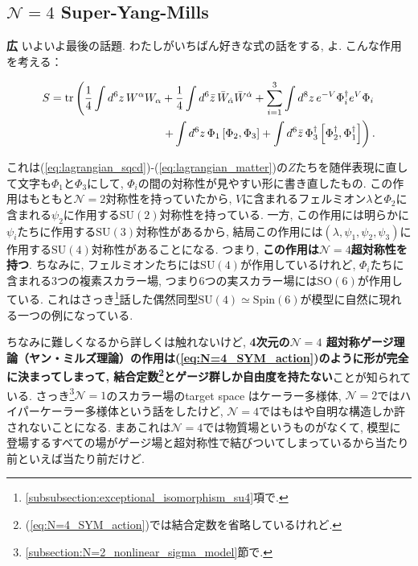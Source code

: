 \documentclass{ltjsarticle}
\theoremstyle{definition}
\newcommand{\parno}{\par\noindent}
\begin{document}
\subsection{$\mathcal N=4$ Super-Yang-Mills\label{subsection:N=4SYM}}
\noindent
\textbf{広} いよいよ最後の話題. わたしがいちばん好きな式の話をする, よ. こんな作用を考える：
\begin{tcolorbox}
  \begin{align}
    S=\tr\left(\frac14\int d^6z\,W^\alpha W_\alpha+\frac14\int d^6\bar z\,\bar W_{\dot\alpha}\bar W^{\dot\alpha}+\sum_{i=1}^3\int d^8z\,e^{-V}\Phi_i^\dagger e^V\Phi_i\right.\nonumber\\
\left.+\int d^6z\,\Phi_1\left[\Phi_2,\Phi_3\right]+\int d^6\bar z\,\Phi_3^\dagger\left[\Phi_2^\dagger,\Phi_1^\dagger\right]\right).\label{eq:N=4_SYM_action}
  \end{align}
\end{tcolorbox}
\parno
これは(\ref{eq:lagrangian_sqcd})-(\ref{eq:lagrangian_matter})の$Z$たちを随伴表現に直して文字も$\Phi_1$と$\Phi_3$にして, $\Phi_i$の間の対称性が見やすい形に書き直したもの. この作用はもともと$\mathcal N=2$対称性を持っていたから, $V$に含まれるフェルミオン$\lambda$と$\Phi_2$に含まれる$\psi_2$に作用する$\mathrm{SU}(2)$対称性を持っている. 一方, この作用には明らかに$\psi_i$たちに作用する$\mathrm{SU}(3)$対称性があるから, 結局この作用には$(\lambda,\psi_1,\psi_2,\psi_3)$に作用する$\mathrm{SU}(4)$対称性があることになる. つまり, \textbf{この作用は$\mathcal N=4$超対称性を持つ}. ちなみに, フェルミオンたちには$\mathrm{SU}(4)$が作用しているけれど, $\Phi_i$たちに含まれる3つの複素スカラー場, つまり6つの実スカラー場には$\mathrm{SO}(6)$が作用している. これはさっき\footnote{\ref{subsubsection:exceptional_isomorphism_su4}項で.}話した偶然同型$\mathrm{SU}(4)\simeq\mathrm{Spin}(6)$が模型に自然に現れる一つの例になっている.
\par
ちなみに難しくなるから詳しくは触れないけど, \textbf{4次元の$\mathcal N=4$ 超対称ゲージ理論（ヤン・ミルズ理論）の作用は(\ref{eq:N=4_SYM_action})のように形が完全に決まってしまって, 結合定数\footnote{(\ref{eq:N=4_SYM_action})では結合定数を省略しているけれど.}とゲージ群しか自由度を持たない}ことが知られている. さっき\footnote{\ref{subsection:N=2_nonlinear_sigma_model}節で.}$\mathcal N=1$のスカラー場のtarget space はケーラー多様体, $\mathcal N=2$ではハイパーケーラー多様体という話をしたけど, $\mathcal N=4$ではもはや自明な構造しか許されないことになる. まあこれは$\mathcal N=4$では物質場というものがなくて, 模型に登場するすべての場がゲージ場と超対称性で結びついてしまっているから当たり前といえば当たり前だけど.\par
\end{document}
